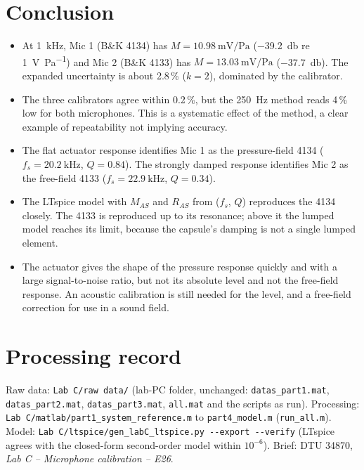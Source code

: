 \documentclass[a4paper,10pt]{article}
\newcommand{\file}[1]{\nolinkurl{#1}}
\begin{document}
\section{Conclusion}
\begin{itemize}
\item At \SI{1}{\kilo\hertz}, Mic 1 (B\&K 4134) has $M=\SI{10.98}{\milli\volt\per\pascal}$
(\SI{-39.2}{\decibel} re \SI{1}{\volt\per\pascal}) and Mic 2 (B\&K 4133) has
$M=\SI{13.03}{\milli\volt\per\pascal}$ (\SI{-37.7}{\decibel}). The expanded uncertainty
is about 2.8\,\% ($k=2$), dominated by the calibrator.
\item The three calibrators agree within 0.2\,\%, but the \SI{250}{\hertz} method reads
4\,\% low for both microphones. This is a systematic effect of the method, a clear example
of repeatability not implying accuracy.
\item The flat actuator response identifies Mic 1 as the pressure-field 4134
($f_s=\SI{20.2}{\kilo\hertz}$, $Q=0.84$). The strongly damped response identifies Mic 2
as the free-field 4133 ($f_s=\SI{22.9}{\kilo\hertz}$, $Q=0.34$).
\item The LTspice model with $M_{AS}$ and $R_{AS}$ from ($f_s$, $Q$) reproduces the 4134
closely. The 4133 is reproduced up to its resonance; above it the lumped model reaches
its limit, because the capsule's damping is not a single lumped element.
\item The actuator gives the shape of the pressure response quickly and with a large
signal-to-noise ratio, but not its absolute level and not the free-field response.
An acoustic calibration is still needed for the level, and a free-field correction for
use in a sound field.
\end{itemize}

\section*{Processing record}
\small
Raw data: \file{Lab C/raw data/} (lab-PC folder, unchanged: \file{datas_part1.mat},
\file{datas_part2.mat}, \file{datas_part3.mat}, \file{all.mat} and the scripts as run).
Processing: \file{Lab C/matlab/part1_system_reference.m} to \file{part4_model.m}
(\file{run_all.m}). Model: \file{Lab C/ltspice/gen_labC_ltspice.py --export --verify}
(LTspice agrees with the closed-form second-order model within $10^{-6}$). Brief: DTU
34870, \emph{Lab C -- Microphone calibration -- E26}.
\end{document}
